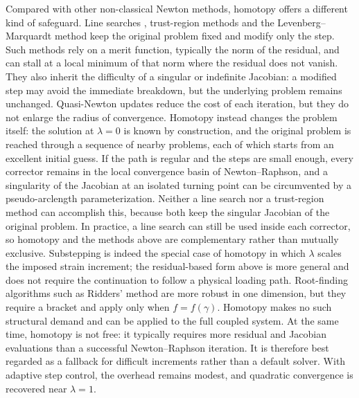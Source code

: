 Compared with other non-classical Newton methods, homotopy offers a different kind of safeguard.
Line searches \cite{Scherzinger2017}, trust-region methods and the Levenberg--Marquardt method keep the original problem fixed and modify only the step.
Such methods rely on a merit function, typically the norm of the residual, and can stall at a local minimum of that norm where the residual does not vanish.
They also inherit the difficulty of a singular or indefinite Jacobian: a modified step may avoid the immediate breakdown, but the underlying problem remains unchanged.
Quasi-Newton updates reduce the cost of each iteration, but they do not enlarge the radius of convergence.
Homotopy instead changes the problem itself: the solution at $\lambda=0$ is known by construction, and the original problem is reached through a sequence of nearby problems, each of which starts from an excellent initial guess.
If the path is regular and the steps are small enough, every corrector remains in the local convergence basin of Newton--Raphson, and a singularity of the Jacobian at an isolated turning point can be circumvented by a pseudo-arclength parameterization.
Neither a line search nor a trust-region method can accomplish this, because both keep the singular Jacobian of the original problem.
In practice, a line search can still be used inside each corrector, so homotopy and the methods above are complementary rather than mutually exclusive.
Substepping is indeed the special case of homotopy in which $\lambda$ scales the imposed strain increment; the residual-based form above is more general and does not require the continuation to follow a physical loading path.
Root-finding algorithms such as Ridders' method are more robust in one dimension, but they require a bracket and apply only when $f=f\left(\gamma\right)$.
Homotopy makes no such structural demand and can be applied to the full coupled system.
At the same time, homotopy is not free: it typically requires more residual and Jacobian evaluations than a successful Newton--Raphson iteration.
It is therefore best regarded as a fallback for difficult increments rather than a default solver.
With adaptive step control, the overhead remains modest, and quadratic convergence is recovered near $\lambda=1$.
